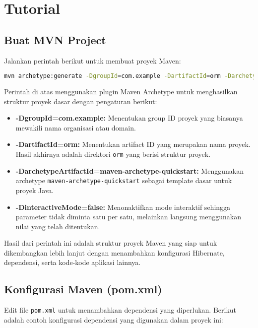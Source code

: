 \section{Tutorial}

\subsection{Buat MVN Project}
Jalankan perintah berikut untuk membuat proyek Maven:
\begin{lstlisting}[language=bash]
	mvn archetype:generate -DgroupId=com.example -DartifactId=orm -DarchetypeArtifactId=maven-archetype-quickstart -DinteractiveMode=false
\end{lstlisting}

Perintah di atas menggunakan plugin Maven Archetype untuk menghasilkan struktur proyek dasar dengan pengaturan berikut:
\begin{itemize}
	\item \textbf{-DgroupId=com.example:} Menentukan group ID proyek yang biasanya mewakili nama organisasi atau domain.
	\item \textbf{-DartifactId=orm:} Menentukan artifact ID yang merupakan nama proyek. Hasil akhirnya adalah direktori \texttt{orm} yang berisi struktur proyek.
	\item \textbf{-DarchetypeArtifactId=maven-archetype-quickstart:} Menggunakan archetype \texttt{maven-archetype-quickstart} sebagai template dasar untuk proyek Java.
	\item \textbf{-DinteractiveMode=false:} Menonaktifkan mode interaktif sehingga parameter tidak diminta satu per satu, melainkan langsung menggunakan nilai yang telah ditentukan.
\end{itemize}

Hasil dari perintah ini adalah struktur proyek Maven yang siap untuk dikembangkan lebih lanjut dengan menambahkan konfigurasi Hibernate, dependensi, serta kode-kode aplikasi lainnya.


\subsection{Konfigurasi Maven (pom.xml)}
Edit file \texttt{pom.xml} untuk menambahkan dependensi yang diperlukan. Berikut adalah contoh konfigurasi dependensi yang digunakan dalam proyek ini:


